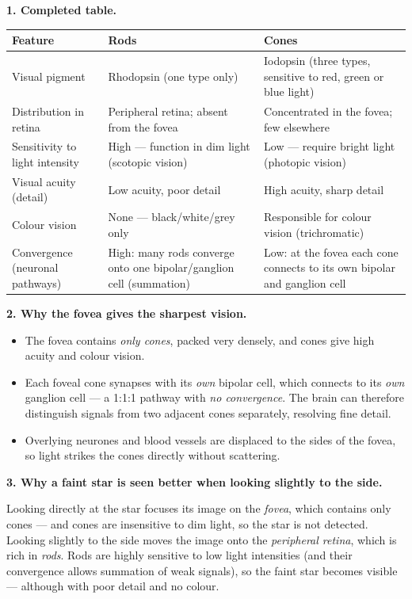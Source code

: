 \documentclass[11pt]{article}
\newcommand{\cle}[1]{{\popxbold\color{popdark}#1}}
\begin{document}
\begin{corrige}
\textbf{1. Completed table.}

\begin{center}
\begin{tabularx}{\linewidth}{|l|X|X|}\hline
\rowcolor{popblueL}\textbf{Feature} & \textbf{Rods} & \textbf{Cones} \\ \hline
Visual pigment & Rhodopsin (one type only) & Iodopsin (three types, sensitive to red, green or blue light) \\ \hline
Distribution in retina & Peripheral retina; absent from the fovea & Concentrated in the fovea; few elsewhere \\ \hline
Sensitivity to light intensity & High — function in dim light (scotopic vision) & Low — require bright light (photopic vision) \\ \hline
Visual acuity (detail) & Low acuity, poor detail & High acuity, sharp detail \\ \hline
Colour vision & None — black/white/grey only & Responsible for colour vision (trichromatic) \\ \hline
Convergence (neuronal pathways) & High: many rods converge onto one bipolar/ganglion cell (summation) & Low: at the fovea each cone connects to its own bipolar and ganglion cell \\ \hline
\end{tabularx}
\end{center}

\textbf{2. Why the fovea gives the sharpest vision.}
\begin{itemize}
\item The fovea contains \emph{only cones}, packed very densely, and cones give high acuity and colour vision.
\item Each foveal cone synapses with its \emph{own} bipolar cell, which connects to its \emph{own} ganglion cell — a 1:1:1 pathway with \emph{no convergence}. The brain can therefore distinguish signals from two adjacent cones separately, resolving fine detail.
\item Overlying neurones and blood vessels are displaced to the sides of the fovea, so light strikes the cones directly without scattering.
\end{itemize}

\textbf{3. Why a faint star is seen better when looking slightly to the side.}\par
Looking directly at the star focuses its image on the \emph{fovea}, which contains only cones — and cones are insensitive to dim light, so the star is not detected. Looking slightly to the side moves the image onto the \emph{peripheral retina}, which is rich in \emph{rods}. Rods are highly sensitive to low light intensities (and their convergence allows \cle{summation} of weak signals), so the faint star becomes visible — although with poor detail and no colour.
\end{corrige}
\end{document}
